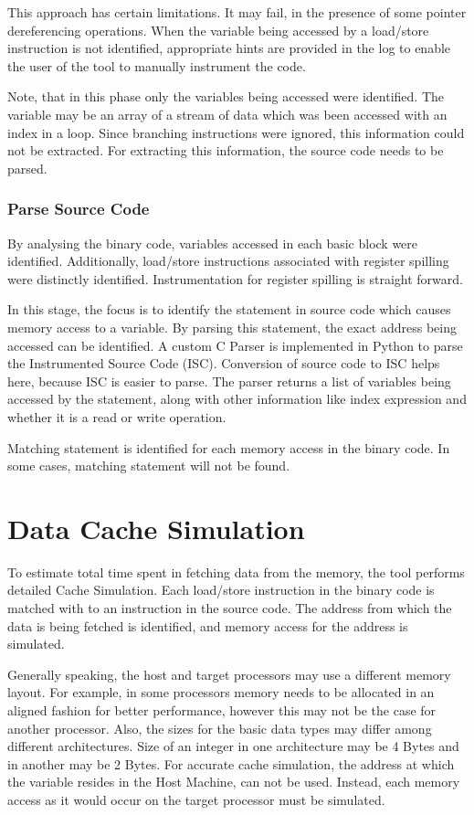 This approach has certain limitations. It may fail, in the presence of some pointer dereferencing operations. When the variable being accessed by a load/store instruction is not identified, appropriate hints are provided in the log to enable the user of the tool to manually instrument the code.

Note, that in this phase only the variables being accessed were identified. The variable may be an array of a stream of data which was been accessed with an index in a loop. Since branching instructions were ignored, this information could not be extracted. For extracting this information, the source code needs to be parsed.

\subsubsection{Parse Source Code}
By analysing the binary code, variables accessed in each basic block were identified. Additionally, load/store instructions associated with register spilling were distinctly identified. Instrumentation for register spilling is straight forward.

In this stage, the focus is to identify the statement in source code which causes memory access to a variable. By parsing this statement, the exact address being accessed can be identified. A custom C Parser is implemented in Python to parse the Instrumented Source Code (ISC). Conversion of source code to ISC helps here, because ISC is easier to parse. The parser returns a list of variables being accessed by the statement, along with other information like index expression and whether it is a read or write operation.

Matching statement is identified for each memory access in the binary code. In some cases, matching statement will not be found.

\section{Data Cache Simulation}
To estimate total time spent in fetching data from the memory, the tool performs detailed Cache Simulation. Each load/store instruction in the binary code is matched with to an instruction in the source code. The address from which the data is being fetched is identified, and memory access for the address is simulated. 

Generally speaking, the host and target processors may use a different memory layout. For example, in some processors memory needs to be allocated in an aligned fashion for better performance, however this may not be the case for another processor. Also, the sizes for the basic data types may differ among different architectures. Size of an integer in one architecture may be 4 Bytes and in another may be 2 Bytes. For accurate cache simulation, the address at which the variable resides in the Host Machine, can not be used. Instead, each memory access as it would occur on the target processor must be simulated.

